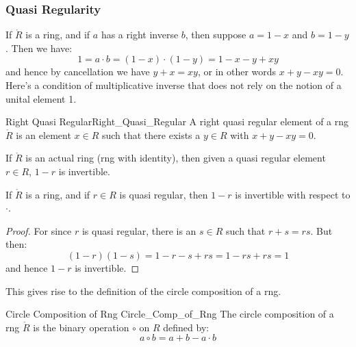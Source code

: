 \documentclass{article}                                                        %
\begin{document}
            \subsubsection{Quasi Regularity}
                If $\ring{R}$ is a ring, and if $a$ has a right inverse $b$,
                then suppose $a=1-x$ and $b=1-y$. Then we have:
                \begin{equation}
                    1=a\cdot{b}=(1-x)\cdot(1-y)=1-x-y+xy
                \end{equation}
                and hence by cancellation we have $y+x=xy$, or in other words
                $x+y-xy=0$. Here's a condition of multiplicative inverse that
                does not rely on the notion of a unital element 1.
                \begin{fdefinition}{Right Quasi Regular}{Right_Quasi_Regular}
                    A right quasi regular element of a rng $\ring{R}$ is an
                    element $x\in{R}$ such that there exists a $y\in{R}$ with
                    $x+y-xy=0$.
                \end{fdefinition}
                If $\ring{R}$ is an actual ring (rng with identity), then given
                a quasi regular element $r\in{R}$, $1-r$ is invertible.
                \begin{theorem}
                    If $\ring{R}$ is a ring, and if $r\in{R}$ is quasi regular,
                    then $1-r$ is invertible with respect to $\cdot$.
                \end{theorem}
                \begin{proof}
                    For since $r$ is quasi regular, there is an $s\in{R}$ such
                    that $r+s=rs$. But then:
                    \begin{equation}
                        (1-r)(1-s)=1-r-s+rs=1-rs+rs=1
                    \end{equation}
                    and hence $1-r$ is invertible.
                \end{proof}
                This gives rise to the definition of the circle composition of a
                rng.
                \begin{fdefinition}{Circle Composition of Rng}
                                   {Circle_Comp_of_Rng}
                    The circle composition of a rng $\ring{R}$ is the binary
                    operation $\circ$ on $R$ defined by:
                    \begin{equation*}
                        a\circ{b}=a+b-a\cdot{b}
                    \end{equation*}
                \end{fdefinition}
\end{document}
